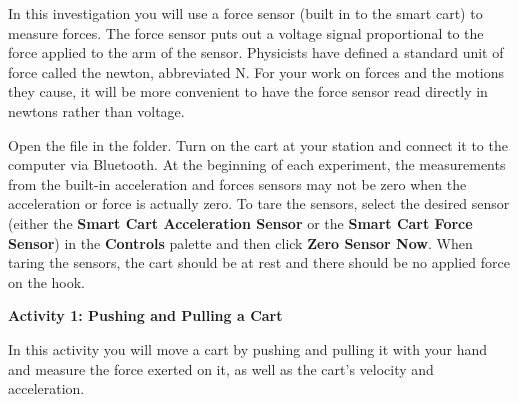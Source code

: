 In this investigation you will use a force sensor (built in to the smart cart) to measure forces. The force sensor puts out a voltage signal proportional to the force applied to the arm of the sensor. Physicists have defined a standard unit of force called the newton, abbreviated N. For your work on forces and the motions they cause, it will be more convenient to have the force sensor read directly in newtons rather than voltage. 

Open the  file in the \filename{\coursefolder} folder. Turn on the cart at your station and connect it to the computer via Bluetooth. At the beginning of each experiment, the measurements from the built-in acceleration and forces sensors may not be zero when the acceleration or force is actually zero. To tare the sensors, select the desired sensor (either the \textbf{Smart Cart Acceleration Sensor} or the \textbf{Smart Cart Force Sensor}) in the \textbf{Controls} palette and then click \textbf{Zero Sensor Now}. When taring the sensors, the cart should be at rest and there should be no applied force on the hook.

%

\textbf{Activity 1: Pushing and Pulling a Cart} 

In this activity you will move a cart by pushing and pulling it with your hand and measure the force exerted on it, as well as the cart's velocity and acceleration. 


